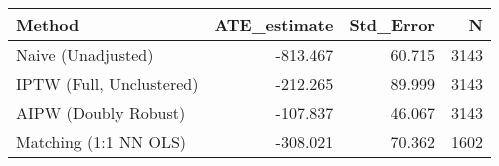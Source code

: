 \begin{tabular}{lrrr}
\toprule
Method & ATE_estimate & Std_Error & N \\
\midrule
Naive (Unadjusted) & -813.467 & 60.715 & 3143 \\
IPTW (Full, Unclustered) & -212.265 & 89.999 & 3143 \\
AIPW (Doubly Robust) & -107.837 & 46.067 & 3143 \\
Matching (1:1 NN OLS) & -308.021 & 70.362 & 1602 \\
\bottomrule
\end{tabular}

